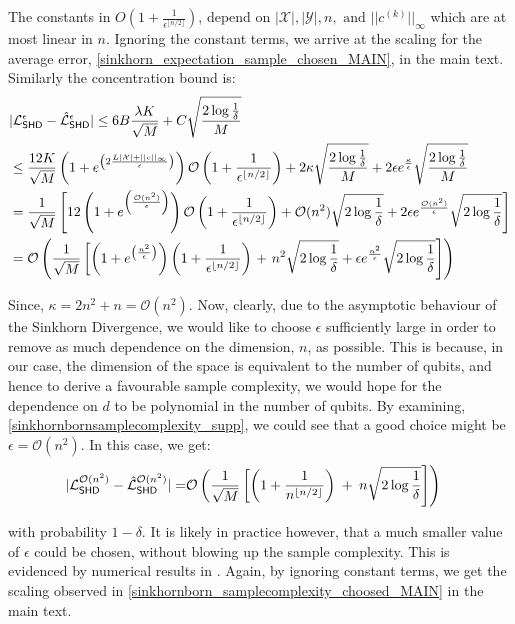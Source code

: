 The constants in $O\left(1+\frac{1}{\epsilon^{\lfloor n/2\rfloor}}\right)$, depend on $|\mathcal{X}|, |\mathcal{Y}|, n, \text{ and } ||c^{(k)}||_\infty$ which are at most linear in $n$. Ignoring the constant terms, we arrive at the scaling for the average error, \eqref{sinkhorn_expectation_sample_chosen_MAIN}, in the main text. Similarly the concentration bound is: 
\begin{align}
    &|\mathcal{L}_{\operatorname{\textsf{SHD}}}^\epsilon - \hat{\mathcal{L}}_{\operatorname{\textsf{SHD}}}^\epsilon| \leq 6B\frac{\lambda K}{\sqrt{M}} + C\sqrt{\frac{2\log\frac{1}{\delta}}{M}}\\
    &\leq \frac{12K}{\sqrt{M}}\left(1+e^{\left(2\frac{L|\mathcal{X}|+||c||_{\infty}}{\epsilon}\right)}\right)\mathcal{O}\left(1+\frac{1}{\epsilon^{\lfloor n/2\rfloor}}\right)+ 2\kappa\sqrt{\frac{2\log\frac{1}{\delta}}{M}} + 2\epsilon e^{\frac{\kappa}{\epsilon}}\sqrt{\frac{2\log\frac{1}{\delta}}{M}}\\
    &= \frac{1}{\sqrt{M}}\left[12\left(1+e^{\left(\frac{\mathcal{O}(n^{2})}{\epsilon}\right)}\right)\mathcal{O}\left(1+\frac{1}{\epsilon^{\lfloor n/2\rfloor}}\right)+\mathcal{O}(n^{2})\sqrt{2\log\frac{1}{\delta}} + 2\epsilon e^{\frac{\mathcal{O}(n^{2})}{\epsilon}}\sqrt{2\log\frac{1}{\delta}}\right]\\
    &= \mathcal{O}\left(\frac{1}{\sqrt{M}}\left[\left(1+e^{\left(\frac{n^{2}}{\epsilon}\right)}\right)\left(1+\frac{1}{\epsilon^{\lfloor n/2\rfloor}}\right)\right.+ \left.n^{2}\sqrt{2\log\frac{1}{\delta}}  + \epsilon e^{\frac{n^{2}}{\epsilon}}\sqrt{2\log\frac{1}{\delta}}\right]\right) \label{sinkhornbornsamplecomplexity_supp}
\end{align}


Since, $\kappa = 2n^2+n = \mathcal{O}(n^{2})$. Now, clearly, due to the asymptotic behaviour of the Sinkhorn Divergence, we would like to choose $\epsilon$ sufficiently large in order to remove as much dependence on the dimension, $n$, as possible. This is because, in our case, the dimension of the space is equivalent to the number of qubits, and hence to derive a favourable sample complexity, we would hope for the dependence on $d$ to be polynomial in the number of qubits. By examining, \eqref{sinkhornbornsamplecomplexity_supp}, we could see that a good choice might be $\epsilon = \mathcal{O}(n^{2})$. In this case, we get:
\begin{align}
    |\mathcal{L}_{\operatorname{\textsf{SHD}}}^{\mathcal{O}(n^{2})} - \hat{\mathcal{L}}_{\operatorname{\textsf{SHD}}}^{\mathcal{O}(n^{2})}| 
    = &\mathcal{O}\left(\frac{1}{\sqrt{M}}\left[\left(1+\frac{1}{n^{\lfloor n/2\rfloor}}\right)\right.\right.+ \left.\left.n\sqrt{2\log\frac{1}{\delta}}\right]\right) \label{sinkhornbornsamplecomplexitychoosed_supp}
\end{align}


with probability $1-\delta$. It is likely in practice however, that a much smaller value of $\epsilon$ could be chosen, without blowing up the sample complexity. This is evidenced by numerical results in . Again, by ignoring constant terms, we get the scaling observed in \eqref{sinkhornborn_samplecomplexity_choosed_MAIN} in the main text.


